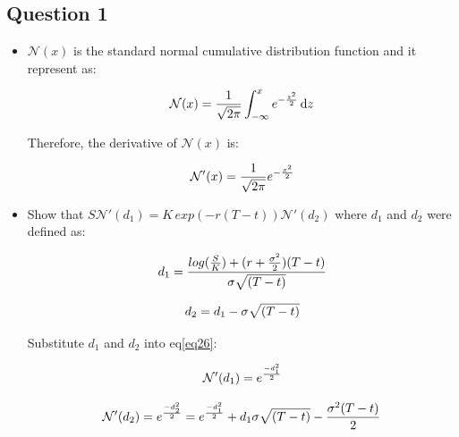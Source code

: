 \documentclass[sigconf]{acmart}
\begin{document}
\subsection{Question 1}
\begin{itemize}
\item
$\mathcal{N}(x)$ is the standard normal cumulative distribution function and it represent as:

\begin{equation} \label{eq25}
\setlength{\abovedisplayskip}{3pt}
\setlength{\belowdisplayskip}{9pt}
\mathcal{N}(x)=\frac{1}{\sqrt{2\pi}} \int_{-\infty}^{x} e^{-\frac{z^2}{2}}\,\mathrm{d}z
\end{equation}

Therefore, the derivative of $\mathcal{N}(x)$ is:

\begin{equation} \label{eq26}
\setlength{\abovedisplayskip}{3pt}
\setlength{\belowdisplayskip}{9pt}
\mathcal{N'}(x)=\frac{1}{\sqrt{2\pi}} e^{-\frac{x^2}{2}} ~\\
\end{equation}


\item
Show that $S\mathcal{N'}(d_{1})=K\,exp(-r(T-t))\mathcal{N'}(d_{2})$ where $d_{1}$ and $d_{2}$ were defined as:

\begin{equation} \label{eq27}
\setlength{\abovedisplayskip}{3pt}
\setlength{\belowdisplayskip}{3pt}
d_{1}=\frac{log(\frac{S}{K})+(r+\frac{\sigma^{2}}{2})(T-t)}{\sigma \sqrt{(T-t)}}
\end{equation}

\begin{equation} \label{eq28}
\setlength{\abovedisplayskip}{3pt}
\setlength{\belowdisplayskip}{9pt}
d_{2}= d_{1} - \sigma \sqrt{(T-t)}
\end{equation}

Substitute $d_{1}$ and $d_{2}$ into eq\eqref{eq26}:

\begin{equation} \label{eq29}
\setlength{\abovedisplayskip}{3pt}
\setlength{\belowdisplayskip}{9pt}
\mathcal{N'}{(d_{1})} = e^{\frac{-d_{1}^{2}}{2}}
\end{equation}

\begin{equation} \label{eq30}
\setlength{\abovedisplayskip}{3pt}
\setlength{\belowdisplayskip}{9pt}
\mathcal{N'}{(d_{2})} = e^{\frac{-d_{2}^{2}}{2}}=e^{\frac{-d_{1}^{2}}{2}}+ d_{1}\sigma \sqrt{(T-t)}-\frac{\sigma^{2}(T-t)}{2}
\end{equation}


\end{itemize}
\end{document}
